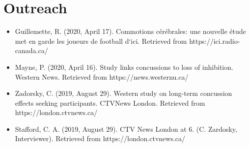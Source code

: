 \documentclass[letterpaper]{twentysecondcv} %
\begin{document}
\begin{twenty} %
\end{twenty}


\section{Outreach}

\begin{itemize}
	\item Guillemette, R. (2020, April 17). Commotions c\'er\'ebrales: une nouvelle \'etude met en garde les joueurs de football d`ici. Retrieved from https://ici.radio-canada.ca/
	\item Mayne, P. (2020, April 16). Study links concussions to loss of inhibition. Western News. Retrieved from https://news.westernu.ca/
	\item Zadorsky, C. (2019, August 29). Western study on long-term concussion effects seeking participants. CTVNews London. Retrieved from https://london.ctvnews.ca/
	\item Stafford, C. A. (2019, August 29). CTV News London at 6. (C. Zardosky, Interviewer). Retrieved from https://london.ctvnews.ca/
\end{itemize}


\end{document}
